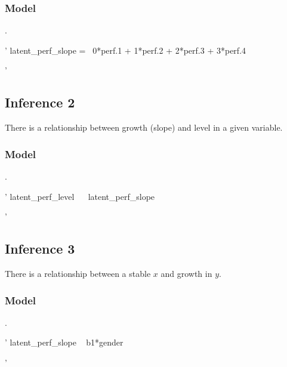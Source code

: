 \documentclass[english,,man]{apa6}
\newenvironment{Shaded}{\begin{snugshade}}{\end{snugshade}}
\newcommand{\StringTok}[1]{\textcolor[rgb]{0.31,0.60,0.02}{#1}}
\theoremstyle{definition}
\theoremstyle{definition}
\theoremstyle{definition}
\theoremstyle{remark}
\begin{document}
\hypertarget{model-2}{%
\subsubsection{Model}\label{model-2}}

.

\begin{Shaded}
\begin{Highlighting}[]
\StringTok{'}
\StringTok{latent_perf_slope =~ 0*perf.1 + 1*perf.2 + 2*perf.3 + 3*perf.4}

\StringTok{'}
\end{Highlighting}
\end{Shaded}

\hypertarget{inference-2-1}{%
\subsection{Inference 2}\label{inference-2-1}}

There is a relationship between growth (slope) and level in a given
variable.

\hypertarget{model-3}{%
\subsubsection{Model}\label{model-3}}

.

\begin{Shaded}
\begin{Highlighting}[]
\StringTok{'}
\StringTok{latent_perf_level ~~ latent_perf_slope}

\StringTok{'}
\end{Highlighting}
\end{Shaded}

\hypertarget{inference-3}{%
\subsection{Inference 3}\label{inference-3}}

There is a relationship between a stable \(x\) and growth in \(y\).

\hypertarget{model-4}{%
\subsubsection{Model}\label{model-4}}

.

\begin{Shaded}
\begin{Highlighting}[]
\StringTok{'}
\StringTok{latent_perf_slope ~ b1*gender}

\StringTok{'}
\end{Highlighting}
\end{Shaded}
\end{document}

